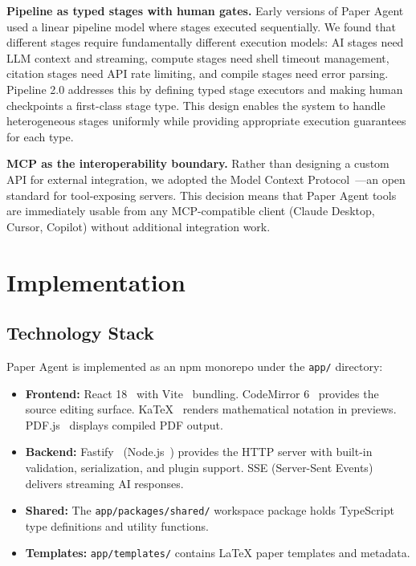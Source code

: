\documentclass[11pt,a4paper]{article}
\newcommand{\software}{Paper Agent}
\begin{document}
\textbf{Pipeline as typed stages with human gates.} Early versions of
\software{} used a linear pipeline model where stages executed sequentially. We
found that different stages require fundamentally different execution models:
AI stages need LLM context and streaming, compute stages need shell timeout
management, citation stages need API rate limiting, and compile stages need
error parsing. Pipeline 2.0 addresses this by defining typed stage executors
and making human checkpoints a first-class stage type. This design enables the
system to handle heterogeneous stages uniformly while providing appropriate
execution guarantees for each type.

\textbf{MCP as the interoperability boundary.} Rather than designing a custom
API for external integration, we adopted the Model Context
Protocol~\cite{modelcontextprotocol2024}---an open standard for tool-exposing
servers. This decision means that \software{} tools are immediately usable from
any MCP-compatible client (Claude Desktop, Cursor, Copilot) without additional
integration work.

\section{Implementation}

\subsection{Technology Stack}

\software{} is implemented as an npm monorepo under the \texttt{app/} directory:

\begin{itemize}
  \item \textbf{Frontend:} React 18~\cite{reactjs} with Vite~\cite{vite}
  bundling. CodeMirror 6~\cite{codemirror} provides the source editing surface.
  KaTeX~\cite{katex} renders mathematical notation in previews. PDF.js~\cite{pdfjs}
  displays compiled PDF output.

  \item \textbf{Backend:} Fastify~\cite{fastify} (Node.js~\cite{nodejs})
  provides the HTTP server with built-in validation, serialization, and plugin
  support. SSE (Server-Sent Events)~\cite{sse_spec} delivers streaming AI
  responses.

  \item \textbf{Shared:} The \texttt{app/packages/shared/} workspace package
  holds TypeScript type definitions and utility functions.

  \item \textbf{Templates:} \texttt{app/templates/} contains \LaTeX{} paper
  templates and metadata.
\end{itemize}
\end{document}
